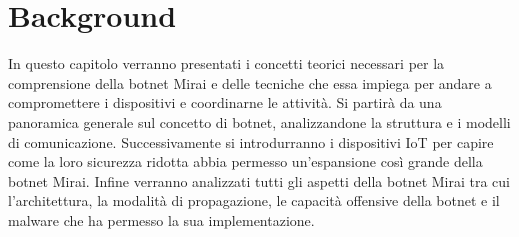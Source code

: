 \chapter{Background}\label{ch:etichtta}
In questo capitolo verranno presentati i concetti teorici necessari per la comprensione della botnet Mirai e delle tecniche che essa impiega per andare a compromettere i dispositivi e coordinarne le attività.
\newline Si partirà da una panoramica generale sul concetto di botnet, analizzandone la struttura e i modelli di comunicazione. Successivamente si introdurranno i dispositivi IoT per capire come la loro sicurezza ridotta abbia permesso un'espansione così grande della botnet Mirai. Infine verranno analizzati tutti gli aspetti della botnet Mirai tra cui l'architettura, la modalità di propagazione, le capacità offensive della botnet e il malware che ha permesso la sua implementazione.
